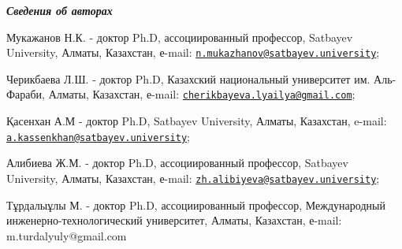 \emph{{\bfseries Сведения об авторах}}

Мукажанов Н.К. - доктор Ph.D, ассоциированный профессор, Satbayev
University, Алматы, Казахстан, е-mail:
\href{mailto:n.mukazhanov@satbayev.university}{\nolinkurl{n.mukazhanov@satbayev.university}};

Черикбаева Л.Ш. - доктор Ph.D, Казахский национальный университет им.
Аль-Фараби, Алматы, Казахстан, е-mail:
\href{mailto:cherikbayeva.lyailya@gmail.com}{\nolinkurl{cherikbayeva.lyailya@gmail.com}};

Қасенхан А.М - доктор Ph.D, Satbayev University, Алматы, Казахстан,
e-mail:
\href{mailto:a.kassenkhan@satbayev.university}{\nolinkurl{a.kassenkhan@satbayev.university}};

Алибиева Ж.М. - доктор Ph.D, ассоциированный профессор, Satbayev
University, Алматы, Казахстан, е-mail:
\href{mailto:zh.alibiyeva@satbayev.university}{\nolinkurl{zh.alibiyeva@satbayev.university}};

Тұрдалыұлы М. - доктор Ph.D, ассоциированный профессор, Международный
инженерно-технологический университет, Алматы, Казахстан, е-mail:
m.turdalyuly@gmail.com